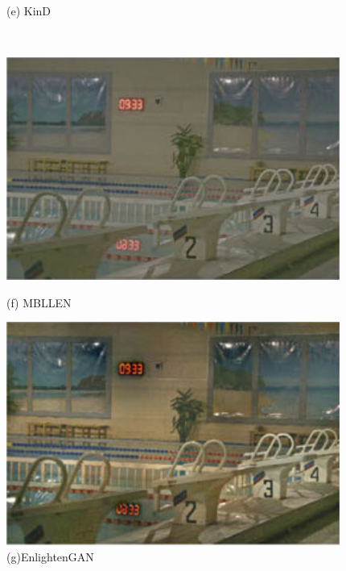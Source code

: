 \documentclass[CJK,aspectratio=169]{beamer}  %
\begin{document}
\begin{frame}
\begin{figure}
\begin{minipage}{0.19\textwidth}
			\caption*{\tiny (e) KinD}
			\label{fig: KinD}	
		\end{minipage}\\
		\vspace{-0.3cm}
		\begin{minipage}{0.19\textwidth}
			\includegraphics[width=\linewidth]{picture/LLIE/Efficent/MBLLEN}
			\caption*{\tiny (f) MBLLEN}
			\label{fig: MBLLEN_contrast}	
		\end{minipage}
		\begin{minipage}{0.19\textwidth}
			\includegraphics[width=\linewidth]{picture/LLIE/Efficent/EnlightenGAN}
			\caption*{\tiny (g)EnlightenGAN}
			\label{fig: LLI EnlightenGAN}	
		\end{minipage}
		\begin{minipage}{0.19\textwidth}

\end{minipage}
\end{figure}
\end{frame}
\end{document}
